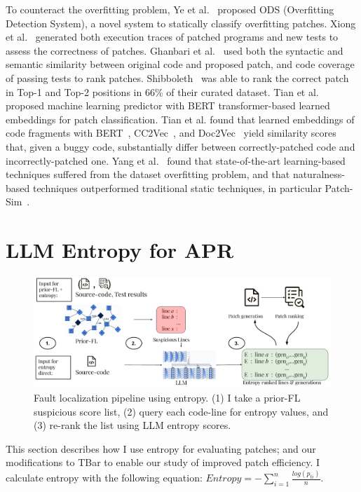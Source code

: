 \documentclass[12pt,openany,oneside,table]{cmuthesis}
\begin{document}
To counteract the overfitting problem, Ye et al.~\cite{ye_patches} proposed ODS (Overfitting Detection System), a novel system to statically classify overfitting patches. Xiong et al.~\cite{patch-sim} generated both execution traces of patched programs and new tests to assess the correctness of patches. Ghanbari et al.~\cite{Shibboleth} used both the syntactic and semantic similarity between original code and proposed patch, and code coverage of passing tests to rank patches. Shibboleth~\cite{Shibboleth} was able to rank the correct patch in Top-1 and Top-2 positions in 66\% of their curated dataset. Tian et al.~\cite{Panther} proposed machine learning predictor with BERT transformer-based learned embeddings for patch classification. Tian et al. found that learned embeddings of code fragments with BERT~\cite{BERT}, CC2Vec~\cite{cc2vec}, and Doc2Vec~\cite{doc2vec} yield similarity scores that, given a buggy code, substantially differ between correctly-patched code and incorrectly-patched one. Yang et al.~\cite{yang2023large} found that state-of-the-art learning-based techniques suffered from the dataset overfitting problem, and that naturalness-based techniques outperformed traditional static techniques, in particular Patch-Sim~\cite{patch-sim}.

\section{LLM Entropy for APR}
\begin{figure}[t]
\centering
\includegraphics[width=\textwidth]{figures/approach/entropy_approach.pdf}
\caption{Fault localization pipeline using entropy. (1) I take a prior-FL suspicious score list, (2) query each code-line for entropy values, and (3) re-rank the list using LLM entropy scores.}
\label{fig:fl-method}
\end{figure}


This section describes how I use entropy for evaluating patches; and our modifications to TBar to enable our
 study of improved patch efficiency.
I calculate entropy with the following equation:
$Entropy = -\sum_{i=1}^{n}\frac{log(p_{ti})}{n}$.
\end{document}
